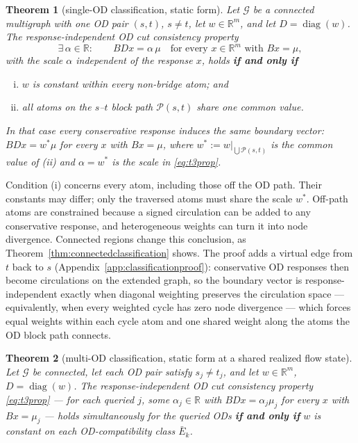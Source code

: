 \documentclass[a4paper,fleqn]{cas-sc}
\newtheorem{theorem}{Theorem}
\newcommand{\R}{\mathbb{R}}
\begin{document}
\begin{theorem}[single-OD classification, static form]\label{thm:t3cpmain}
Let $\mathcal{G}$ be a connected multigraph with one OD pair $(s,t)$,
\textbf{$s\neq t$}, let
$w\in\R^m$, and let $D=\operatorname{diag}(w)$. The
\emph{response-independent OD cut consistency property}
\begin{equation}
\exists\,\alpha\in\R:\qquad BDx=\alpha\,\mu
\quad\text{for every }x\in\R^m\text{ with }Bx=\mu,
\label{eq:t3prop}
\end{equation}
with the scale $\alpha$ independent of the response $x$, holds
\textbf{if and only if}
\begin{enumerate}[(i)]
\item $w$ is constant within every non-bridge atom; and
\item all atoms on the $s$--$t$ block path $\mathcal{P}(s,t)$ share
one common value.
\end{enumerate}
In that case every conservative response induces the same boundary vector:
$BDx=w^*\mu$ for every $x$ with $Bx=\mu$, where
$w^*:=w|_{\bigcup\mathcal{P}(s,t)}$ is the common value of (ii) and
$\alpha=w^*$ is the scale in \eqref{eq:t3prop}.
\end{theorem}

Condition (i) concerns every atom, including those off the OD path. Their
constants may differ; only the traversed atoms must share the scale $w^*$.
Off-path atoms are constrained because a signed circulation can
be added to any conservative response, and heterogeneous weights can turn
it into node divergence. Connected regions change this conclusion, as
Theorem~\ref{thm:connectedclassification} shows. The proof adds a virtual
edge from $t$ back to $s$
(Appendix~\ref{app:classificationproof}): conservative OD responses then
become circulations on the extended graph, so the boundary vector is
response-independent exactly when diagonal weighting preserves the
circulation space --- equivalently, when every weighted cycle has zero
node divergence --- which forces equal weights within each cycle atom
and one shared weight along the atoms the OD block path connects.

\begin{theorem}[multi-OD classification, static form at a shared
realized flow state]\label{thm:t3cm}
Let $\mathcal{G}$ be connected, let each OD pair satisfy $s_j\ne t_j$,
and let $w\in\R^m$, $D=\operatorname{diag}(w)$. The
response-independent OD cut consistency property \eqref{eq:t3prop}
--- for each queried $j$, some $\alpha_j\in\R$ with
$BDx=\alpha_j\mu_j$ for every $x$ with $Bx=\mu_j$ --- holds
simultaneously for the queried ODs \textbf{if and only if} $w$ is
constant on each OD-compatibility class $\bar{E}_k$.
\end{theorem}
\end{document}
